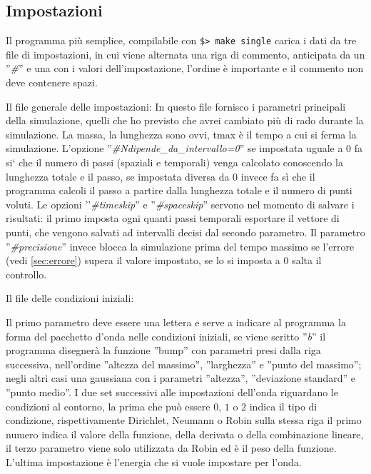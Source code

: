 \subsection{Impostazioni}
Il programma pi\`u semplice, compilabile con \lstinline|$> make single| carica i dati da tre file di impostazioni, in cui viene alternata una riga di commento, anticipata da un ''\textit{\#}'' e una con i valori dell'impostazione, l'ordine \`e importante e il commento non deve contenere spazi.

Il file generale delle impostazioni:
\label{lst:settings}
In questo file fornisco i parametri principali della simulazione, quelli che ho previsto che avrei cambiato pi\`u di rado durante la simulazione. La massa, la lunghezza sono ovvi, tmax \`e il tempo a cui si ferma la simulazione. L'opzione ''\textit{\#Ndipende\_da\_intervallo=0}'' se impostata uguale a $0$ fa si` che il numero di passi (spaziali e temporali) venga calcolato conoscendo la lunghezza totale e il passo, se impostata diversa da $0$ invece fa s\`i che il programma calcoli il passo a partire dalla lunghezza totale e il numero di punti voluti. Le opzioni ''\textit{\#timeskip}'' e ''\textit{\#spaceskip}'' servono nel momento di salvare i risultati: il primo imposta ogni quanti passi temporali esportare il vettore di punti, che vengono salvati ad intervalli decisi dal secondo parametro. Il parametro ''\textit{\#precisione}'' invece blocca la simulazione prima del tempo massimo se l'errore (vedi \autoref{sec:errore}) supera il valore impostato, se lo si imposta a 0 salta il controllo.

Il file delle condizioni iniziali:

Il primo parametro deve essere una lettera e serve a indicare al programma la forma del pacchetto d'onda nelle condizioni iniziali, se viene scritto ''\textit{b}'' il programma disegner\`a la funzione ''bump'' con parametri presi dalla riga successiva, nell'ordine ''altezza del massimo'', ''larghezza'' e ''punto del massimo''; negli altri casi una gaussiana con i parametri ''altezza'', ''deviazione standard'' e ''punto medio''. I due set successivi alle impostazioni dell'onda riguardano le condizioni al contorno, la prima che pu\`o essere $0$, $1$ o $2$ indica il tipo di condizione, rispettivamente Dirichlet, Neumann o Robin sulla stessa riga il primo numero indica il valore della funzione, della derivata o della combinazione lineare, il terzo parametro viene solo utilizzata da Robin ed \`e il peso della funzione.
L'ultima impostazione \`e l'energia che si vuole impostare per l'onda.

